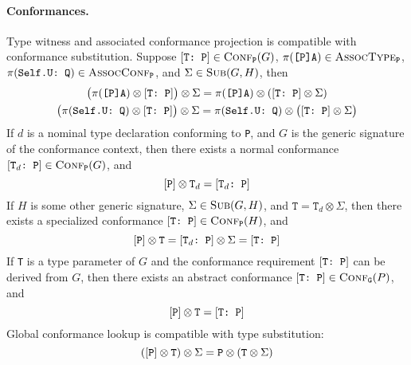 \documentclass[../generics]{subfiles}
\begin{document}
\paragraph{Conformances.} Type witness and associated conformance projection is compatible with conformance substitution. Suppose $[\texttt{T:~P}]\in\textsc{Conf}_{\texttt{P}}({G})$, $\pi(\texttt{[P]A})\in\textsc{AssocType}_{\texttt{P}}$, $\pi(\texttt{Self.U:~Q})\in\textsc{AssocConf}_{\texttt{P}}$, and $\Sigma\in\textsc{Sub}({G, H})$, then
\begin{gather*}
\bigl(\pi(\texttt{[P]A})\otimes [\texttt{T:~P}]\bigr)\otimes \Sigma=\pi(\texttt{[P]A})\otimes ([\texttt{T:~P}]\otimes \Sigma)\\
\bigl(\pi(\texttt{Self.U:~Q})\otimes [\texttt{T:~P}]\bigr)\otimes \Sigma=\pi(\texttt{Self.U:~Q})\otimes \bigl([\texttt{T:~P}]\otimes \Sigma\bigr)
\end{gather*}
If $d$ is a nominal type declaration conforming to \texttt{P}, and $G$ is the generic signature of the conformance context, then there exists a normal conformance $[\texttt{$\texttt{T}_d$:~P}]\in\textsc{Conf}_{\texttt{P}}({G})$, and
\[[\texttt{P}]\otimes\texttt{T}_d=[\texttt{$\texttt{T}_d$:~P}]\]
If $H$ is some other generic signature, $\Sigma\in\textsc{Sub}({G, H})$, and $\texttt{T}=\texttt{T}_d\otimes \Sigma$, then there exists a specialized conformance $[\texttt{T:~P}]\in\textsc{Conf}_{\texttt{P}}({H})$, and
\[[\texttt{P}]\otimes\texttt{T}=[\texttt{$\texttt{T}_d$:~P}]\otimes \Sigma = [\texttt{T:~P}]\]
If \texttt{T} is a type parameter of $G$ and the conformance requirement $[\texttt{T:~P}]$ can be derived from $G$, then there exists an abstract conformance $[\texttt{T:~P}]\in\textsc{Conf}_{\texttt{G}}({P})$, and
\[[\texttt{P}]\otimes\texttt{T} = [\texttt{T:~P}]\]
Global conformance lookup is compatible with type substitution:
\[([\texttt{P}]\otimes\texttt{T})\otimes \Sigma = \texttt{P}\otimes(\texttt{T}\otimes \Sigma)\]
\end{document}

